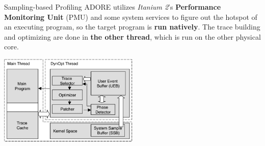 \documentclass[aspectratio=169,xcolor=x11names]{beamer}
\begin{document}
	\begin{frame}{Sampling-based Profiling}
		\alert{ADORE} utilizes \textit{Itanium 2}'s \textbf{Performance Monitoring Unit} (PMU) and some system services to figure out the hotspot of an executing program, so the target program is \textbf{run natively}. The trace building and optimizing are done in \textbf{the other thread}, which is run on the other physical core.
		
		\begin{center}
			\includegraphics[width=0.5\textwidth]{ADORE-framework}
		\end{center}
	\end{frame}
\end{document}
